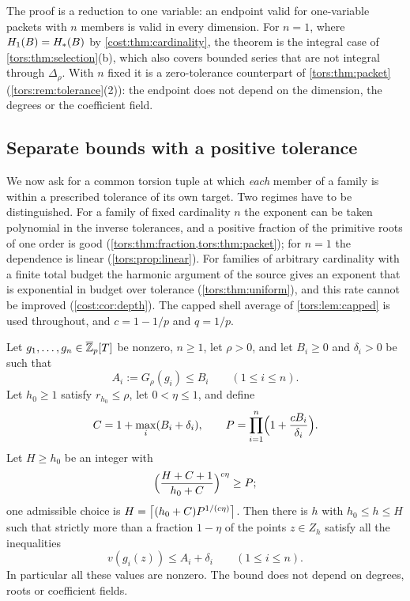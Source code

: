 The proof is a reduction to one variable: an endpoint valid for one-variable packets with
$n$ members is valid in every dimension. For $n=1$, where $H_1(B)=\torsHs(B)$ by
\cref{cost:thm:cardinality}, the theorem is the integral case of
\cref{tors:thm:selection}\textup{(b)}, which also covers bounded series that are not
integral through $\Delta_\rho$. With $n$ fixed it is a zero-tolerance counterpart of
\cref{tors:thm:packet} (\cref{tors:rem:tolerance}(2)): the endpoint does not depend on the
dimension, the degrees or the coefficient field.

\subsection{Separate bounds with a positive tolerance}\label{tors:sec:tolerance}

We now ask for a common torsion tuple at which \emph{each} member of a family is within a
prescribed tolerance of its own target. Two regimes have to be distinguished. For a family
of fixed cardinality $n$ the exponent can be taken polynomial in the inverse tolerances,
and a positive fraction of the primitive roots of one order is good
(\cref{tors:thm:fraction,tors:thm:packet}); for $n=1$ the dependence is linear
(\cref{tors:prop:linear}). For families of arbitrary cardinality with a finite total
budget the harmonic argument of the source gives an exponent that is exponential in
budget over tolerance (\cref{tors:thm:uniform}), and this rate cannot be improved
(\cref{cost:cor:depth}). The capped shell average of \cref{tors:lem:capped} is used
throughout, and $c=1-1/p$ and $q=1/p$.

\begin{theorem}
\label{tors:thm:fraction}
Let $g_1,\dots,g_n\in\overline{\Z}_p[T]$ be nonzero, $n\ge1$, let $\rho>0$, and let
$B_i\ge0$ and
$\delta_i>0$ be such that
\[
  A_i:=G_\rho(g_i)\le B_i\qquad(1\le i\le n).
\]
Let $h_0\ge1$ satisfy $r_{h_0}\le\rho$, let $0<\eta\le1$, and define
\begin{equation}\label{tors:eq:CP}
  C=1+\max_i(B_i+\delta_i),\qquad P=\prod_{i=1}^n\Bigl(1+\frac{cB_i}{\delta_i}\Bigr).
\end{equation}
Let $H\ge h_0$ be an integer with
\begin{equation}\label{tors:eq:Hcondition}
  \Bigl(\frac{H+C+1}{h_0+C}\Bigr)^{c\eta}\ge P ;
\end{equation}
one admissible choice is $H=\ceil[\big]{(h_0+C)P^{1/(c\eta)}}$. Then there is $h$ with
$h_0\le h\le H$ such that strictly more than a fraction $1-\eta$ of the points
$z\in Z_h$ satisfy all the inequalities
\begin{equation}\label{tors:eq:desired}
  v(g_i(z))\le A_i+\delta_i\qquad(1\le i\le n).
\end{equation}
In particular all these values are nonzero. The bound does not depend on degrees, roots or
coefficient fields.
\end{theorem}

